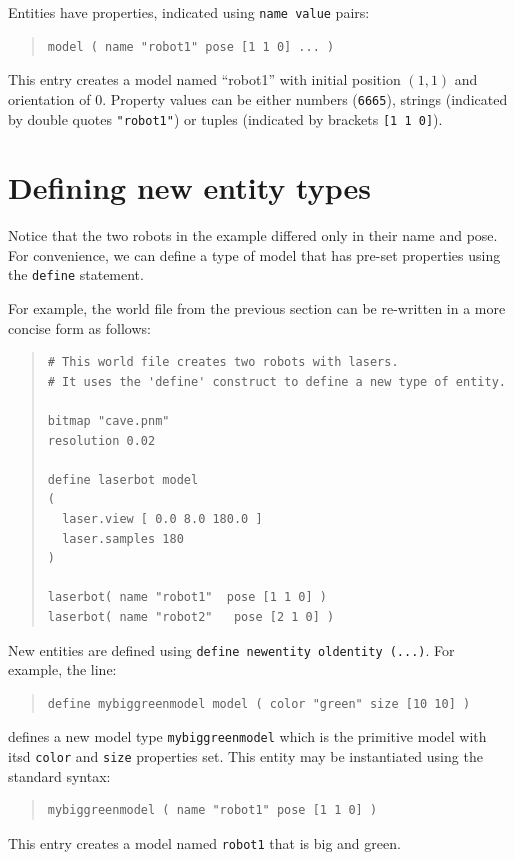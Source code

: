 \documentclass[letter,11pt,twoside]{report}
\begin{document}
Entities have properties, indicated using \verb'name value' pairs:
\begin{quote}
\begin{verbatim}
model ( name "robot1" pose [1 1 0] ... )
\end{verbatim}
\end{quote}
This entry creates a model named ``robot1'' with initial position $(1,
1)$ and orientation of $0$.  Property values can be either numbers
(\verb'6665'), strings (indicated by double quotes \verb'"robot1"') or
tuples (indicated by brackets \verb'[1 1 0]').

\section{Defining new entity types}

Notice that the two robots in the example differed only in their name
and pose. For convenience, we can define a type of model that has pre-set properties using the \verb'define' statement.

For example, the world file from the previous section can be re-written
in a more concise form as follows:
\begin{quote}
\begin{verbatim}
# This world file creates two robots with lasers.
# It uses the 'define' construct to define a new type of entity.

bitmap "cave.pnm" 
resolution 0.02

define laserbot model
(
  laser.view [ 0.0 8.0 180.0 ]	
  laser.samples 180
)

laserbot( name "robot1"  pose [1 1 0] )
laserbot( name "robot2"   pose [2 1 0] )
\end{verbatim}
\end{quote}
New entities are defined using \verb'define newentity oldentity (...)'.
For example, the line:
\begin{quote}
\begin{verbatim}
define mybiggreenmodel model ( color "green" size [10 10] )
\end{verbatim}
\end{quote}
defines a new model type \verb'mybiggreenmodel' which is the primitive model with itsd \verb'color' and \verb'size' properties set.
This entity may be instantiated using the standard syntax:
\begin{quote}
\begin{verbatim}
mybiggreenmodel ( name "robot1" pose [1 1 0] )
\end{verbatim}
\end{quote}
This entry creates a model named \verb'robot1' that is big and green.
\end{document}
